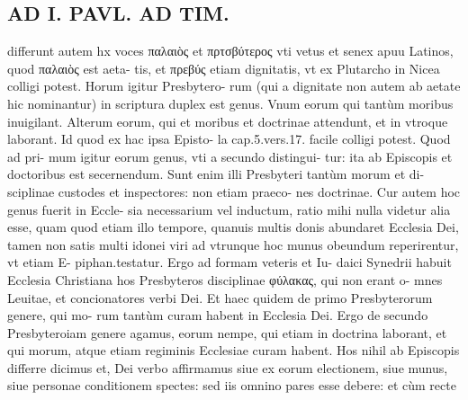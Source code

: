 \documentclass{article}
\begin{document}
\begin{pages}
\section*{AD I. PAVL. AD TIM. }
\marginpar{[ p.94 ]}\pstart differunt autem hx voces παλαιὸς et πρτσβύτερος vti vetus et senex apuu Latinos, quod παλαιὸς est aeta- tis, et πρεβύς etiam dignitatis, vt ex Plutarcho in Nicea colligi potest. Horum igitur Presbytero- rum (qui a dignitate non autem ab aetate hic nominantur) in scriptura duplex est genus. Vnum eorum qui tantùm moribus inuigilant. Alterum eorum, qui et moribus et doctrinae attendunt, et in vtroque laborant. Id quod ex hac ipsa Episto- la cap.5.vers.17. facile colligi potest. Quod ad pri- mum igitur eorum genus, vti a secundo distingui- tur: ita ab Episcopis et doctoribus est secernendum. Sunt enim illi Presbyteri tantùm morum et di- sciplinae custodes et inspectores: non etiam praeco- nes doctrinae. Cur autem hoc genus fuerit in Eccle- sia necessarium vel inductum, ratio mihi nulla videtur alia esse, quam quod etiam illo tempore, quanuis multis donis abundaret Ecclesia Dei, tamen non satis multi idonei viri ad vtrunque hoc munus obeundum reperirentur, vt etiam E- piphan.testatur. Ergo ad formam veteris et Iu- daici Synedrii habuit Ecclesia Christiana hos Presbyteros disciplinae φύλακας, qui non erant o- mnes Leuitae, et concionatores verbi Dei. Et haec quidem de primo Presbyterorum genere, qui mo- rum tantùm curam habent in Ecclesia Dei. Ergo de secundo Presbyteroiam genere agamus, eorum nempe, qui etiam in doctrina laborant, et qui morum, atque etiam regiminis Ecclesiae curam habent. Hos nihil ab Episcopis differre dicimus et, Dei verbo affirmamus siue ex eorum electionem, siue munus, siue personae conditionem spectes: sed iis omnino pares esse debere: et cùm recte  \pend

\end{pages}
\end{document}
